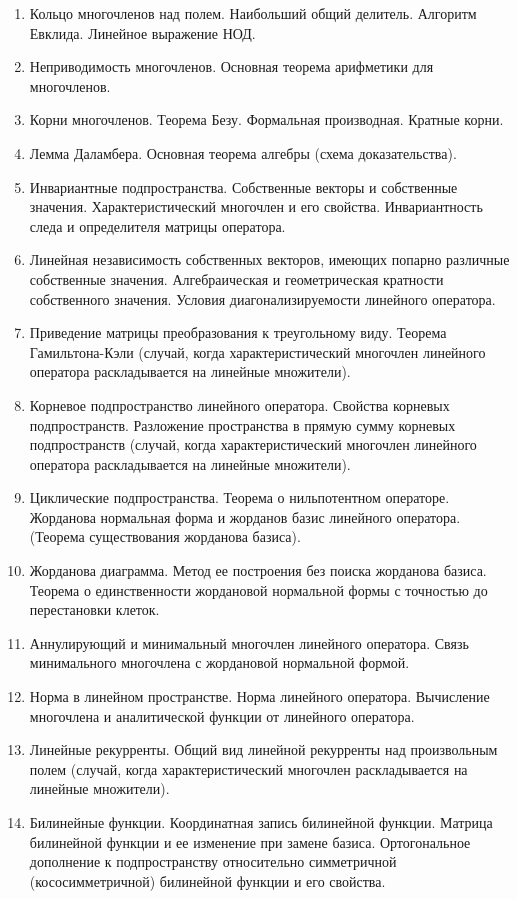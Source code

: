 \begin{enumerate}
    \item Кольцо многочленов над полем. Наибольший общий делитель. Алгоритм Евклида. Линейное выражение НОД.
    \item Неприводимость многочленов. Основная теорема арифметики для многочленов.
    \item Корни многочленов. Теорема Безу. Формальная производная. Кратные корни.
    \item Лемма Даламбера. Основная теорема алгебры (схема доказательства).
    \item Инвариантные подпространства. Собственные векторы и собственные значения. Характеристический многочлен и его свойства. Инвариантность следа и определителя матрицы оператора.
    \item Линейная независимость собственных векторов, имеющих попарно различные собственные значения. Алгебраическая и геометрическая кратности собственного значения. Условия диагонализируемости линейного оператора.
    \item Приведение матрицы преобразования к треугольному виду. Теорема Гамильтона-Кэли (случай, когда характеристический многочлен линейного оператора раскладывается на линейные множители).
    \item Корневое подпространство линейного оператора. Свойства корневых подпространств. Разложение пространства в прямую сумму корневых подпространств (случай, когда характеристический многочлен линейного оператора раскладывается на линейные множители).
    \item Циклические подпространства. Теорема о нильпотентном операторе. Жорданова нормальная форма и жорданов базис линейного оператора. (Теорема существования жорданова базиса).
    \item Жорданова диаграмма. Метод ее построения без поиска жорданова базиса. Теорема о единственности жордановой нормальной формы с точностью до перестановки клеток.
    \item Аннулирующий и минимальный многочлен линейного оператора. Связь минимального многочлена с жордановой нормальной формой.
    \item Норма в линейном пространстве. Норма линейного оператора. Вычисление многочлена и аналитической функции от линейного оператора.
    \item Линейные рекурренты. Общий вид линейной рекурренты над произвольным полем (случай, когда характеристический многочлен раскладывается на линейные множители).
    \item Билинейные функции. Координатная запись билинейной функции. Матрица билинейной функции и ее изменение при замене базиса. Ортогональное дополнение к подпространству относительно симметричной (кососимметричной) билинейной функции и его свойства.

\end{enumerate}
